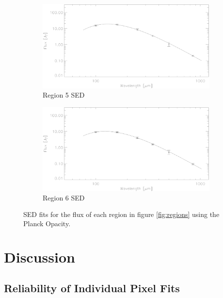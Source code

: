 \begin{figure}
  \begin{subfigure}[t]{.48\textwidth}
    \centering
    \includegraphics[width=1.\textwidth]{sed_imgs/region_5beta_20_SED_fit.eps}
    \caption{Region 5 SED}
  \end{subfigure}
  \quad
  \begin{subfigure}[t]{.48\textwidth}
    \centering
    \includegraphics[width=1.\textwidth]{sed_imgs/region_6beta_195_SED_fit.eps}
    \caption{Region 6 SED}
  \end{subfigure}
  \caption[Region Flux SED Fits]{SED fits for the flux of each region in figure \ref{fig:regions} using the Planck Opacity.}
  \label{fig:SED_region}
\end{figure}
  
\section{Discussion}
\subsection{Reliability of Individual Pixel Fits}


